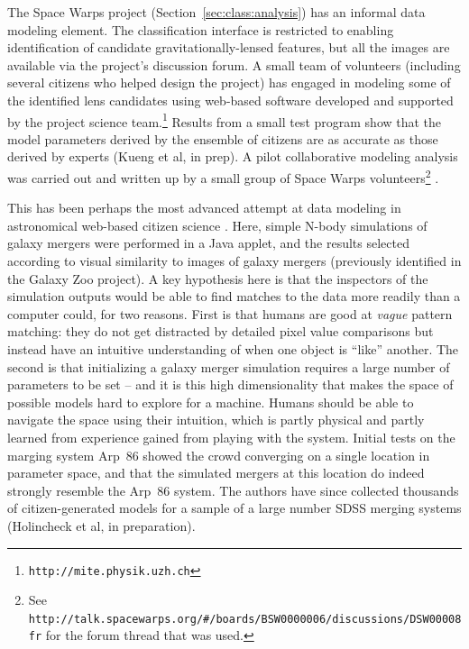 \documentclass{ar2e}
\def\Sref#1{Section~\ref{#1}\xspace}
\def\CaseStudy#1{\noindent{\it\bf #1 \,\,\,\,}}
\def\url#1{\texttt{#1}}
\begin{document}

\CaseStudy{Modelling Lens Candidates} 
The Space Warps project (\Sref{sec:class:analysis}) has an informal data
modeling element. The classification interface is restricted to enabling
identification of candidate gravitationally-lensed features, but all the images
are available via the project's discussion forum. A small team of volunteers
(including several citizens who helped design the project) has engaged in
modeling some of the identified lens candidates using web-based software
developed and supported by the project science
team.\footnote{\url{http://mite.physik.uzh.ch}} Results from a small test
program show that the model parameters derived by the  ensemble of citizens are
as accurate as those derived by experts 
(Kueng et al, in prep).
A pilot collaborative modeling analysis was carried out and written up by a
small group of Space Warps volunteers\footnote{See
\url{http://talk.spacewarps.org/\#/boards/BSW0000006/discussions/DSW00008fr} for
the forum thread that was used.} \citep{Wilcox2014}.



\CaseStudy{Galaxy Zoo: Mergers} 
This has been perhaps the most advanced attempt at data modeling in 
astronomical web-based citizen science \citep{HolincheckEtal2010,WallinEtal2010}.
Here, simple N-body simulations of galaxy mergers were performed in a Java
applet, and the results selected according to visual similarity to images of
galaxy mergers (previously identified in the Galaxy Zoo project). A key
hypothesis here is that the inspectors of the simulation outputs would be able
to find matches to the data more readily than a computer could, for two reasons.
First is that humans are good at {\it vague} pattern matching: they do not get
distracted by detailed pixel value comparisons but instead have an intuitive
understanding of when one object is ``like'' another. The second is that
initializing a galaxy merger simulation requires a large number of parameters to
be set -- and it is this high dimensionality  that makes the space of possible
models hard to explore for a machine. Humans should be able to navigate the
space using their intuition, which is partly physical and partly learned from
experience gained from playing with the system. Initial tests on the marging
system Arp~86 showed
the crowd converging on a single location in parameter space, and that the
simulated mergers at this location do indeed strongly resemble the Arp~86
system. The authors have since collected thousands of citizen-generated models
for a sample of a large number SDSS merging systems (Holincheck et al, in
preparation). 
\end{document}
